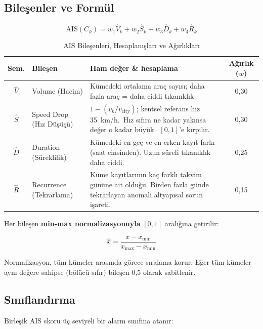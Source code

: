 \documentclass[12pt,a4paper]{article}
\begin{document}
\subsection{Bileşenler ve Formül}

\begin{equation}
\text{AIS}(C_k) = w_1 \hat{V}_k + w_2 \hat{S}_k + w_3 \hat{D}_k + w_4 \hat{R}_k
\label{eq:ais}
\end{equation}

\begin{table}[H]
\centering
\caption{AIS Bileşenleri, Hesaplanışları ve Ağırlıkları}
\label{tab:ais-components}
\begin{tabularx}{\textwidth}{c l X c}
\toprule
\textbf{Sem.} & \textbf{Bileşen} & \textbf{Ham değer \& hesaplama} & \textbf{Ağırlık ($w$)} \\
\midrule
$\hat{V}$ & Volume (Hacim) &
    Kümedeki ortalama araç sayısı; daha fazla araç = daha ciddi tıkanıklık &
    0,30 \\
$\hat{S}$ & Speed Drop (Hız Düşüşü) &
    $1 - (\bar{v}_k / v_{\text{city}})$; kentsel referans hız 35~km/h.\ Hız sıfıra ne kadar yakınsa değer o kadar büyük.\ $[0,1]$'e kırpılır. &
    0,30 \\
$\hat{D}$ & Duration (Süreklilik) &
    Kümedeki en geç ve en erken kayıt farkı (saat cinsinden). Uzun süreli tıkanıklık daha ciddi. &
    0,25 \\
$\hat{R}$ & Recurrence (Tekrarlama) &
    Küme kayıtlarının kaç farklı takvim gününe ait olduğu. Birden fazla günde tekrarlayan anomali altyapısal sorun işareti. &
    0,15 \\
\bottomrule
\end{tabularx}
\end{table}

Her bileşen \textbf{min-max normalizasyonuyla} $[0, 1]$ aralığına getirilir:

\begin{equation}
\hat{x} = \frac{x - x_{\min}}{x_{\max} - x_{\min}}
\label{eq:minmax}
\end{equation}

Normalizasyon, tüm kümeler arasında görece sıralama korur. Eğer tüm kümeler aynı değere sahipse (bölücü sıfır) bileşen 0,5 olarak sabitlenir.

\subsection{Sınıflandırma}

Birleşik AIS skoru üç seviyeli bir alarm sınıfına atanır:
\end{document}
